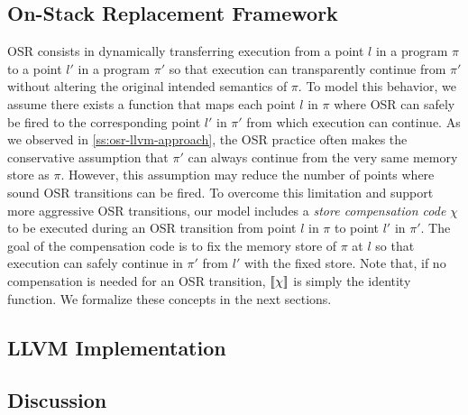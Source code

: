 


\subsection{On-Stack Replacement Framework}

OSR consists in dynamically transferring execution from a point $l$ in a program $\pi$ to a point $l'$ in a program $\pi'$ so that execution can transparently continue from $\pi'$ without altering the original intended semantics of $\pi$. To model this behavior, we assume there exists a function that maps each point $l$ in $\pi$ where OSR can safely be fired to the corresponding point $l'$ in $\pi'$ from which execution can continue.
As we observed in \mysection\ref{ss:osr-llvm-approach}, the OSR practice often makes the conservative assumption that $\pi'$ can always continue from the very same memory store as $\pi$. However, this assumption may reduce the number of points where sound OSR transitions can be fired. To overcome this limitation and support more aggressive OSR transitions, our model includes a {\em store compensation code} $\chi$ to be executed during an OSR transition from point $l$ in $\pi$ to point $l'$ in $\pi'$. The goal of the compensation code is to fix the memory store of $\pi$ at $l$ so that execution can safely continue in $\pi'$ from $l'$ with the fixed store. Note that, if no compensation is needed for an OSR transition, $[\![\chi]\!]$ is simply the identity function. We formalize these concepts in the next sections.







\subsection{LLVM Implementation}

\subsection{Discussion}